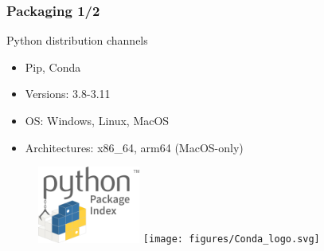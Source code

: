\documentclass[aspectratio=169]{beamer}
\begin{document}


\begin{frame}
\frametitle{Packaging 1/2}
\begin{block}{Python distribution channels}
\begin{itemize}
\item Pip, Conda
\item Versions: 3.8-3.11
\item OS: Windows, Linux, MacOS
\item Architectures: x86\_64, arm64 (MacOS-only)
\end{itemize}
\end{block}

\begin{figure}
   \includegraphics[width=0.3\textwidth]{figures/PyPI_logo}
   \texttt{[image: figures/Conda\_logo.svg]}
\end{figure}

\end{frame}
\end{document}
